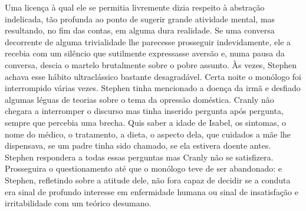Uma licença à qual ele se permitia livremente dizia respeito à abstração
indelicada, tão profunda ao ponto de sugerir grande atividade mental, mas
resultando, no fim das contas, em alguma dura realidade.  Se uma conversa decorrente de alguma trivialidade lhe parecesse prosseguir
indevidamente, ele a recebia com um silêncio que sutilmente expressasse aversão
e, numa pausa da conversa, descia o martelo brutalmente sobre o pobre assunto.
Às vezes, Stephen achava esse hábito ultraclássico bastante desagradável.
Certa noite o monólogo foi interrompido várias vezes.  Stephen tinha mencionado
a doença da irmã e desfiado algumas léguas de teorias sobre o tema da opressão
doméstica.  Cranly não chegara a interromper o discurso mas tinha inserido
pergunta após pergunta, sempre que percebia uma brecha.  Quis saber a idade de
Isabel, os sintomas, o nome do médico, o tratamento, a dieta, o aspecto dela,
que cuidados a mãe lhe dispensava, se um padre tinha sido chamado, se ela
estivera doente antes.  Stephen respondera a todas essas perguntas mas Cranly
não se satisfizera.  Prosseguira o questionamento até que o monólogo teve de
ser abandonado: e Stephen, refletindo sobre a atitude dele, não fora capaz de
decidir se a conduta era sinal de profundo interesse em enfermidade humana ou
sinal de insatisfação e irritabilidade com um teórico desumano.

